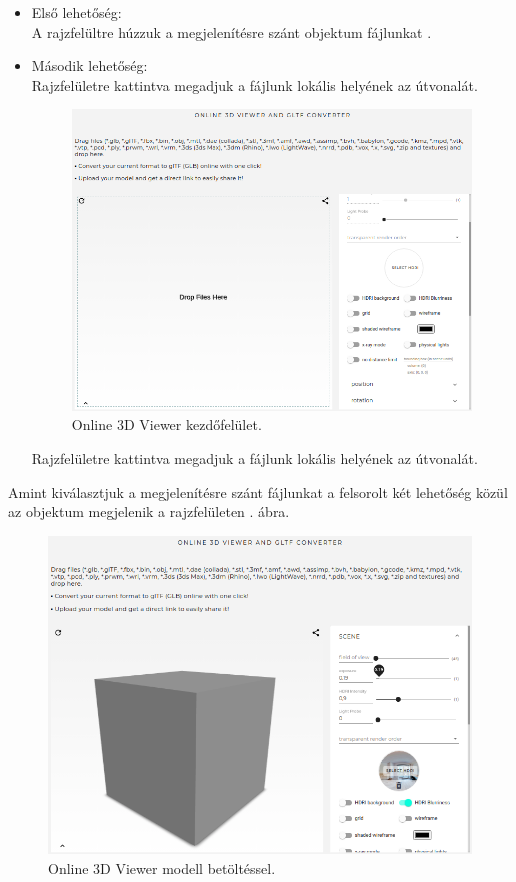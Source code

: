 \begin{itemize}
\item Első lehetőség: \\
A rajzfelültre húzzuk a megjelenítésre szánt objektum fájlunkat .
\item Második lehetőség:\\
Rajzfelületre kattintva megadjuk a fájlunk lokális helyének az útvonalát.\\
\bigskip
\begin{figure}[h]
\centering
\includegraphics[width=\textwidth]{images/3D_creators.png}
\caption{Online 3D Viewer kezdőfelület.}
\label{fig:3d1}
\end{figure}
\bigskip

Rajzfelületre kattintva megadjuk a fájlunk lokális helyének az útvonalát.\\
\end{itemize}
\newpage
\bigskip
Amint kiválasztjuk a megjelenítésre szánt fájlunkat a felsorolt két lehetőség közül az objektum megjelenik a rajzfelületen . ábra.
\bigskip
\begin{figure}[h]
\centering
\includegraphics[width=\textwidth]{images/3D_creators_2.png}
\caption{Online 3D Viewer modell betöltéssel.}
\label{fig:3d2}
\end{figure}
\bigskip

